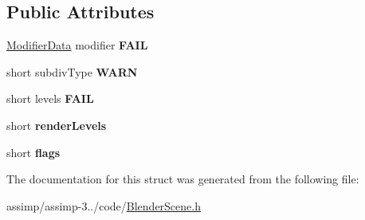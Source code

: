 \subsection*{Public Attributes}
\begin{DoxyCompactItemize}
\item 
\hypertarget{struct_assimp_1_1_blender_1_1_subsurf_modifier_data_ad435afbd076981fb5004ca2bcda8d947}{\hyperlink{struct_assimp_1_1_blender_1_1_modifier_data}{Modifier\+Data} modifier {\bfseries F\+A\+I\+L}}\label{struct_assimp_1_1_blender_1_1_subsurf_modifier_data_ad435afbd076981fb5004ca2bcda8d947}

\item 
\hypertarget{struct_assimp_1_1_blender_1_1_subsurf_modifier_data_ae4a42613e9d040aefce4358df9ef15cf}{short subdiv\+Type {\bfseries W\+A\+R\+N}}\label{struct_assimp_1_1_blender_1_1_subsurf_modifier_data_ae4a42613e9d040aefce4358df9ef15cf}

\item 
\hypertarget{struct_assimp_1_1_blender_1_1_subsurf_modifier_data_aa5d03c8a1a047aafd32f8002968b7ecd}{short levels {\bfseries F\+A\+I\+L}}\label{struct_assimp_1_1_blender_1_1_subsurf_modifier_data_aa5d03c8a1a047aafd32f8002968b7ecd}

\item 
\hypertarget{struct_assimp_1_1_blender_1_1_subsurf_modifier_data_a4379576d94489af9612634ef43a523ff}{short {\bfseries render\+Levels}}\label{struct_assimp_1_1_blender_1_1_subsurf_modifier_data_a4379576d94489af9612634ef43a523ff}

\item 
\hypertarget{struct_assimp_1_1_blender_1_1_subsurf_modifier_data_a6602062d8a0e12671171cc3647a135c8}{short {\bfseries flags}}\label{struct_assimp_1_1_blender_1_1_subsurf_modifier_data_a6602062d8a0e12671171cc3647a135c8}

\end{DoxyCompactItemize}


The documentation for this struct was generated from the following file\+:\begin{DoxyCompactItemize}
\item 
assimp/assimp-\/3../code/\hyperlink{_blender_scene_8h}{Blender\+Scene.\+h}\end{DoxyCompactItemize}

